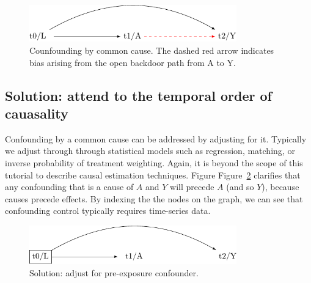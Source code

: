 \documentclass[
  singlecolumn]{report}
\begin{document}
\begin{figure}

{\centering \includegraphics[width=0.8\textwidth,height=\textheight]{causal-dags_files/figure-pdf/fig-dag-common-cause-1.pdf}

}

\caption{\label{fig-dag-common-cause}Counfounding by common cause. The
dashed red arrow indicates bias arising from the open backdoor path from
A to Y.}

\end{figure}

\hypertarget{solution-attend-to-the-temporal-order-of-cauasality}{%
\subsection{Solution: attend to the temporal order of
cauasality}\label{solution-attend-to-the-temporal-order-of-cauasality}}

Confounding by a common cause can be addressed by adjusting for it.
Typically we adjust through through statistical models such as
regression, matching, or inverse probability of treatment weighting.
Again, it is beyond the scope of this tutorial to describe causal
estimation techniques. Figure Figure~\ref{fig-dag-common-cause-solution}
clarifies that any confounding that is a cause of \(A\) and \(Y\) will
precede \(A\) (and so \(Y\)), because causes precede effects. By
indexing the the nodes on the graph, we can see that confounding control
typically requires time-series data.

\begin{figure}

{\centering \includegraphics[width=0.8\textwidth,height=\textheight]{causal-dags_files/figure-pdf/fig-dag-common-cause-solution-1.pdf}

}

\caption{\label{fig-dag-common-cause-solution}Solution: adjust for
pre-exposure confounder.}

\end{figure}
\end{document}
